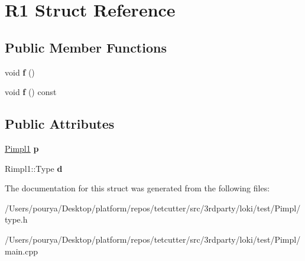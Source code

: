 \hypertarget{structR1}{}\section{R1 Struct Reference}
\label{structR1}
\subsection*{Public Member Functions}
\begin{DoxyCompactItemize}
\item 
\hypertarget{structR1_a77c19f1b5c687106e81d654a825f17b0}{}void {\bfseries f} ()\label{structR1_a77c19f1b5c687106e81d654a825f17b0}

\item 
\hypertarget{structR1_a51948ddb5af7cd2cb9f995eede15ba35}{}void {\bfseries f} () const \label{structR1_a51948ddb5af7cd2cb9f995eede15ba35}

\end{DoxyCompactItemize}
\subsection*{Public Attributes}
\begin{DoxyCompactItemize}
\item 
\hypertarget{structR1_a00b377ad2dd5fdb33235db192a315ef4}{}\hyperlink{classLoki_1_1Pimpl}{Pimpl1} {\bfseries p}\label{structR1_a00b377ad2dd5fdb33235db192a315ef4}

\item 
\hypertarget{structR1_a4a08e1dd24a839074f35068d9dfeef0a}{}Rimpl1\+::\+Type {\bfseries d}\label{structR1_a4a08e1dd24a839074f35068d9dfeef0a}

\end{DoxyCompactItemize}


The documentation for this struct was generated from the following files\+:\begin{DoxyCompactItemize}
\item 
/\+Users/pourya/\+Desktop/platform/repos/tetcutter/src/3rdparty/loki/test/\+Pimpl/type.\+h\item 
/\+Users/pourya/\+Desktop/platform/repos/tetcutter/src/3rdparty/loki/test/\+Pimpl/main.\+cpp\end{DoxyCompactItemize}
